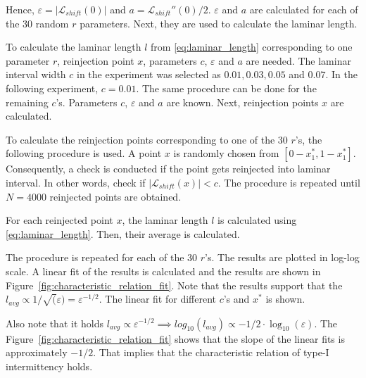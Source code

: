 Hence, $\varepsilon = | \mathcal{L}_{shift}(0) |$ and $a = \mathcal{L}_{shift}''(0) / 2$.
$\varepsilon$ and $a$ are calculated for each of the $30$ random $r$ parameters.
Next, they are used to calculate the laminar length.
\par
To calculate the laminar length $l$ from \eqref{eq:laminar_length} corresponding to one parameter $r$, reinjection point $x$, parameters $c$, $\varepsilon$ and $a$ are needed.
The laminar interval width $c$ in the experiment was selected as $0.01, 0.03, 0.05$ and $0.07$.
In the following experiment, $c = 0.01$.
The same procedure can be done for the remaining $c$'s.
Parameters $c$, $\varepsilon$ and $a$ are known.
Next, reinjection points $x$ are calculated.
\par
To calculate the reinjection points corresponding to one of the $30$ $r$'s, the following procedure is used.
A point $x$ is randomly chosen from $[ 0-x^{*}_{1}, 1-x^{*}_{1} ]$.
Consequently, a check is conducted if the point gets reinjected into laminar interval.
In other words, check if $| \mathcal{L}_{shift}(x) | < c$.
The procedure is repeated until $N = 4000$ reinjected points are obtained.
\par
For each reinjected point $x$, the laminar length $l$ is calculated using \eqref{eq:laminar_length}.
Then, their average is calculated.
\par
The procedure is repeated for each of the $30$ $r$'s.
The results are plotted in log-log scale.
A linear fit of the results is calculated and the results are shown in Figure~\ref{fig:characteristic_relation_fit}.
Note that the results support that the $l_{avg} \propto 1/\sqrt(\varepsilon) = \varepsilon ^ {-1/2}$.
The linear fit for different $c$'s and $x^{*}$ is shown.
\par
Also note that it holds $l_{avg} \propto \varepsilon ^ {-1/2} \implies log_{10}(l_{avg}) \propto -1/2 \cdot \log_{10}(\varepsilon)$.
The Figure~\ref{fig:characteristic_relation_fit} shows that the slope of the linear fits is approximately $-1/2$.
That implies that the characteristic relation of type-I intermittency holds. 

